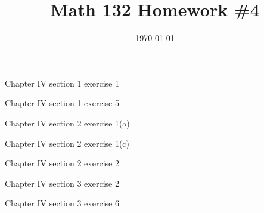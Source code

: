 \documentclass{article}
\date{\today}
\title{Math 132 Homework \#4}
\begin{document}
\maketitle

\begin{prob}
    Chapter IV section 1 exercise 1
\end{prob}

\bigskip
\par
\begin{prob}
    Chapter IV section 1 exercise 5
\end{prob}

\bigskip
\par
\begin{prob}
    Chapter IV section 2 exercise 1(a)
\end{prob}

\bigskip
\par
\begin{prob}
    Chapter IV section 2 exercise 1(c)
\end{prob}

\bigskip
\par
\begin{prob}
    Chapter IV section 2 exercise 2
\end{prob}

\bigskip
\par
\begin{prob}
    Chapter IV section 3 exercise 2
\end{prob}

\bigskip
\par
\begin{prob}
    Chapter IV section 3 exercise 6
\end{prob}



\end{document}
